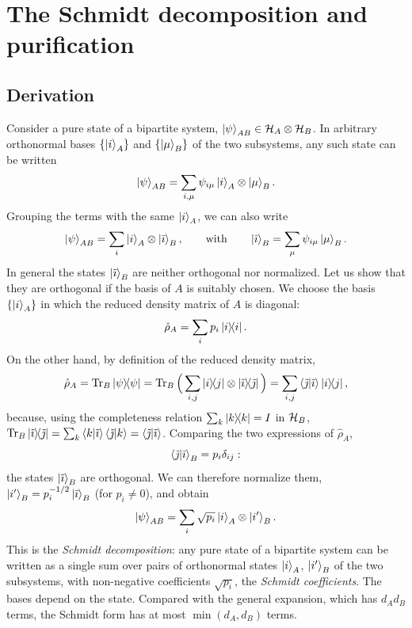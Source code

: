 \chapter{The Schmidt decomposition and purification}\label{app:schmidt}

\section{Derivation}
Consider a pure state of a bipartite system, $\left|\psi\right\rangle_{AB}\in\mathcal H_A\otimes\mathcal H_B$. In arbitrary orthonormal bases $\{\left|i\right\rangle_A\}$ and $\{\left|\mu\right\rangle_B\}$ of the two subsystems, any such state can be written
\begin{equation}
  \left|\psi\right\rangle_{AB}=\sum_{i,\mu}\psi_{i\mu}\left|i\right\rangle_A\otimes\left|\mu\right\rangle_B .
\end{equation}
Grouping the terms with the same $\left|i\right\rangle_A$, we can also write
\begin{equation}
  \left|\psi\right\rangle_{AB}=\sum_i\left|i\right\rangle_A\otimes\left|\tilde\imath\right\rangle_B,\qquad\text{with}\qquad\left|\tilde\imath\right\rangle_B=\sum_\mu\psi_{i\mu}\left|\mu\right\rangle_B .
\end{equation}
In general the states $\left|\tilde\imath\right\rangle_B$ are neither orthogonal nor normalized. Let us show that they are orthogonal if the basis of $A$ is suitably chosen. We choose the basis $\{\left|i\right\rangle_A\}$ in which the reduced density matrix of $A$ is diagonal:
\begin{equation}
  \hat\rho_A=\sum_ip_i\left|i\middle\rangle\!\middle\langle i\right| .
\end{equation}
On the other hand, by definition of the reduced density matrix,
\begin{equation}
  \hat\rho_A=\operatorname{Tr}_B\left|\psi\middle\rangle\!\middle\langle\psi\right|=\operatorname{Tr}_B\Big(\sum_{i,j}\left|i\middle\rangle\!\middle\langle j\right|\otimes\left|\tilde\imath\middle\rangle\!\middle\langle\tilde\jmath\right|\Big)=\sum_{i,j}\left\langle\tilde\jmath\middle|\tilde\imath\right\rangle\left|i\middle\rangle\!\middle\langle j\right|,
\end{equation}
because, using the completeness relation $\sum_k\left|k\middle\rangle\!\middle\langle k\right|=I$ in $\mathcal H_B$, $\operatorname{Tr}_B\left|\tilde\imath\middle\rangle\!\middle\langle\tilde\jmath\right|=\sum_k\left\langle k\middle|\tilde\imath\right\rangle\left\langle\tilde\jmath\middle|k\right\rangle=\left\langle\tilde\jmath\middle|\tilde\imath\right\rangle$. Comparing the two expressions of $\hat\rho_A$,
\begin{equation}
  \left\langle\tilde\jmath\middle|\tilde\imath\right\rangle_B=p_i\delta_{ij}:
\end{equation}
the states $\left|\tilde\imath\right\rangle_B$ are orthogonal. We can therefore normalize them, $\left|i'\right\rangle_B=p_i^{-1/2}\left|\tilde\imath\right\rangle_B$ (for $p_i\neq0$), and obtain
\begin{equation}\label{eq:schmidt}
  \left|\psi\right\rangle_{AB}=\sum_i\sqrt{p_i}\left|i\right\rangle_A\otimes\left|i'\right\rangle_B .
\end{equation}
This is the \emph{Schmidt decomposition}: any pure state of a bipartite system can be written as a single sum over pairs of orthonormal states $\left|i\right\rangle_A$, $\left|i'\right\rangle_B$ of the two subsystems, with non-negative coefficients $\sqrt{p_i}$, the
\emph{Schmidt coefficients}. The bases depend on the state. Compared with the general expansion, which has $d_Ad_B$ terms, the Schmidt form has at most $\min(d_A,d_B)$ terms.


